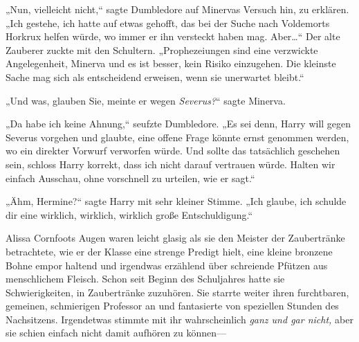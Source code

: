 „Nun, vielleicht nicht,“ sagte Dumbledore auf Minervas Versuch hin, zu erklären. „Ich gestehe, ich hatte auf etwas gehofft, das bei der Suche nach Voldemorts Horkrux helfen würde, wo immer er ihn versteckt haben mag. Aber…“ Der alte Zauberer zuckte mit den Schultern. „Prophezeiungen sind eine verzwickte Angelegenheit, Minerva und es ist besser, kein Risiko einzugehen. Die kleinste Sache mag sich als entscheidend erweisen, wenn sie unerwartet bleibt.“

„Und was, glauben Sie, meinte er wegen \emph{Severus?}“ sagte Minerva.

„Da habe ich keine Ahnung,“ seufzte Dumbledore. „Es sei denn, Harry will gegen Severus vorgehen und glaubte, eine offene Frage könnte ernst genommen werden, wo ein direkter Vorwurf verworfen würde. Und sollte das tatsächlich geschehen sein, schloss Harry korrekt, dass ich nicht darauf vertrauen würde. Halten wir einfach Ausschau, ohne vorschnell zu urteilen, wie er sagt.“


„Ähm, Hermine?“ sagte Harry mit sehr kleiner Stimme. „Ich glaube, ich schulde dir eine wirklich, wirklich, wirklich große Entschuldigung.“


Alissa Cornfoots Augen waren leicht glasig als sie den Meister der Zaubertränke betrachtete, wie er der Klasse eine strenge Predigt hielt, eine kleine bronzene Bohne empor haltend und irgendwas erzählend über schreiende Pfützen aus menschlichem Fleisch. Schon seit Beginn des Schuljahres hatte sie Schwierigkeiten, in Zaubertränke zuzuhören. Sie starrte weiter ihren furchtbaren, gemeinen, schmierigen Professor an und fantasierte von speziellen Stunden des Nachsitzens. Irgendetwas stimmte mit ihr wahrscheinlich \emph{ganz und gar nicht,} aber sie schien einfach nicht damit aufhören zu können—


